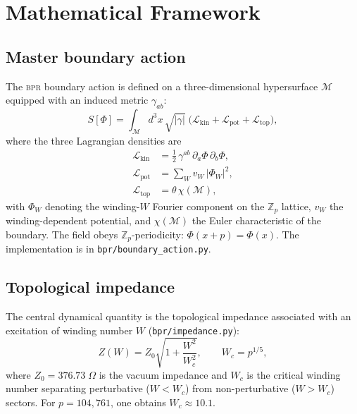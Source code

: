 \documentclass[aps,prd,twocolumn,superscriptaddress,longbibliography,nofootinbib]{revtex4-2}
\newcommand{\Zp}{\mathbb{Z}_p}
\newcommand{\Wc}{W_{\!c}}
\newcommand{\Zimp}{Z}
\newcommand{\Zvac}{Z_0}
\newcommand{\bpr}{\textsc{bpr}}
\begin{document}
\section{Mathematical Framework}
\label{sec:framework}

\subsection{Master boundary action}

The \bpr{} boundary action is defined on a three-dimensional
hypersurface $\mathcal{M}$ equipped with an induced metric
$\gamma_{ab}$:
\begin{equation}
S[\Phi] = \int_{\mathcal{M}} \! d^3x \, \sqrt{|\gamma|} \;
\bigl( \mathcal{L}_{\mathrm{kin}} +
       \mathcal{L}_{\mathrm{pot}} +
       \mathcal{L}_{\mathrm{top}} \bigr),
\label{eq:master_action}
\end{equation}
where the three Lagrangian densities are
\begin{align}
\mathcal{L}_{\mathrm{kin}} &=
  \tfrac{1}{2}\, \gamma^{ab}\, \partial_a \Phi\, \partial_b \Phi,
  \label{eq:Lkin} \\
\mathcal{L}_{\mathrm{pot}} &=
  \sum_{W} v_W \, |\Phi_W|^2,
  \label{eq:Lpot} \\
\mathcal{L}_{\mathrm{top}} &=
  \theta\, \chi(\mathcal{M}),
  \label{eq:Ltop}
\end{align}
with $\Phi_W$ denoting the winding-$W$ Fourier component on the
$\Zp$ lattice, $v_W$ the winding-dependent potential, and
$\chi(\mathcal{M})$ the Euler characteristic of the boundary.  The
field obeys $\Zp$-periodicity: $\Phi(x + p) = \Phi(x)$.  The
implementation is in \texttt{bpr/boundary\_action.py}.

\subsection{Topological impedance}

The central dynamical quantity is the topological impedance
associated with an excitation of winding number $W$
(\texttt{bpr/impedance.py}):
\begin{equation}
\Zimp(W) = \Zvac \sqrt{1 + \frac{W^2}{\Wc^2}},
\qquad \Wc = p^{1/5},
\label{eq:impedance}
\end{equation}
where $\Zvac = 376.73\;\Omega$ is the vacuum impedance and
$\Wc$ is the critical winding number separating perturbative
($W < \Wc$) from non-perturbative ($W > \Wc$) sectors.  For
$p = 104{,}761$, one obtains $\Wc \approx 10.1$.
\end{document}
